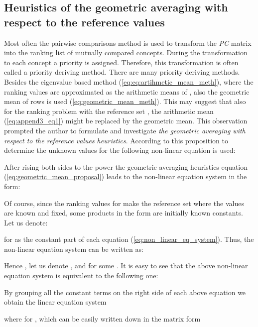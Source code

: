 
\subsection{Heuristics of the geometric averaging with respect to the reference
values\label{sub:Heuristics-of-the}}

Most often the pairwise comparisons method is used to transform the
\emph{PC} matrix into the ranking list of mutually compared concepts.
During the transformation to each concept a priority is assigned.
Therefore, this transformation is often called a priority deriving
method. There are many priority deriving methods. Besides the eigenvalue
based method (\ref{eq:eq:artihmetic_mean_meth}), where the ranking
values  are approximated as the arithmetic means of ,
also the geometric mean of rows is used (\ref{eq:geometric_mean_meth}).
This may suggest that also for the ranking problem with the reference
set \citep{Kulakowski2013hrea}, the arithmetic mean (\ref{eq:append3_eq1})
might be replaced by the geometric mean. This observation prompted
the author to formulate and investigate \emph{the geometric averaging
with respect to the reference values heuristics}. According to this
proposition to determine the unknown values  for 
the following non-linear equation is used: 



After rising both sides to the  power the geometric averaging
heuristics equation (\ref{eq:geometric_mean_proposal}) leads to the
non-linear equation system in the form: 



Of course, since the ranking values for 
make the reference set where the values  are known and
fixed, some products in the form  are initially
known constants. Let us denote:



for  as the constant part of each equation (\ref{eq:non_linear_eq_system}).
Thus, the non-linear equation system can be written as: 



Hence , let us denote
,
 and 
for some . It is easy to see that the above
non-linear equation system is equivalent to the following one: 



By grouping all the constant terms on the right side of each above
equation we obtain the linear equation system 




where 
for , which can be easily written down in the matrix
form 

